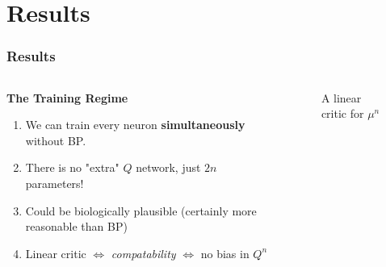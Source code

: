 \documentclass{beamer}
\newcommand*{\Scale}[2][4]{\scalebox{#1}{$#2$}}%
\numberwithin{equation}{subsection}
\numberwithin{theorem}{subsection}
\begin{document}
\section{Results}
\begin{frame}
\frametitle{Results}
      \begin{columns}
      \begin{column}{0.6\textwidth}

  \textbf{The Training Regime}
  \begin{enumerate}
  \item We can train every neuron \textbf{simultaneously} without BP.
  \item There is no "extra" $Q$ network, just $2n$ parameters!
  \item Could be biologically plausible (certainly more reasonable than BP)
  \item Linear critic $\iff$ \emph{compatability} $\iff$ no bias in $Q^n$
  \end{enumerate}
      \end{column}
      \begin{column}{0.4\textwidth}
      \begin{figure}
          \begin{centering}
          \end{centering}
          \caption{A linear critic for $\mu^n$ }
      \end{figure}
      
      \end{column}
    \end{columns}

\end{frame}
\end{document}

